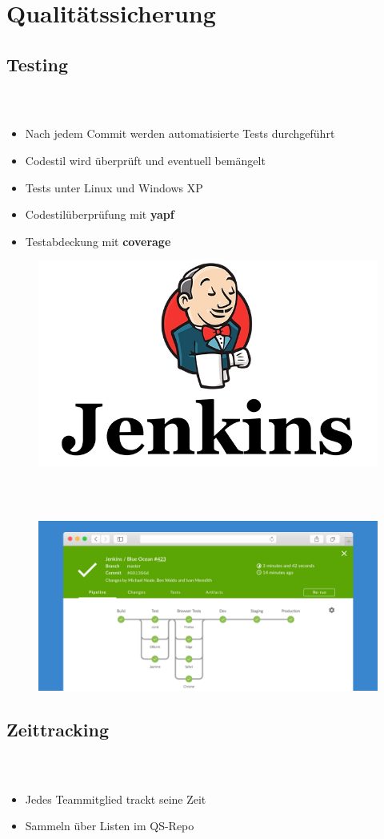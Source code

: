 \documentclass[accentcolor=tud1b,colorbacktitle,landscape,german,presentation]{tudbeamer}
\newcommand{\ftitle}{

	\frametitle{\insertsectionhead \\ {\small \insertsubsectionhead}}
}
\begin{document}
\section{Qualitätssicherung}
\subsection{Testing}

\begin{frame}
	\ftitle
	\begin{itemize}
		\item Nach jedem Commit werden automatisierte Tests durchgeführt\pause
		\item Codestil wird überprüft und eventuell bemängelt\pause
		\item Tests unter Linux und Windows XP\pause
		\item Codestilüberprüfung mit \textbf{yapf}\pause
		\item Testabdeckung mit \textbf{coverage}\pause
	\end{itemize}
			\begin{figure}
				\centering
				\includegraphics[scale=0.3]{jenkins}
			\end{figure}
\end{frame}

\begin{frame}
	\ftitle
	\begin{figure}
		\centering
		\includegraphics[width=0.9\linewidth]{pipeline}
	\end{figure}
\end{frame}

\subsection{Zeittracking}
\begin{frame}
	\ftitle
	\begin{itemize}
		\item Jedes Teammitglied trackt seine Zeit\pause
		\item Sammeln über Listen im QS-Repo
	\end{itemize}
\end{frame}
\end{document}
